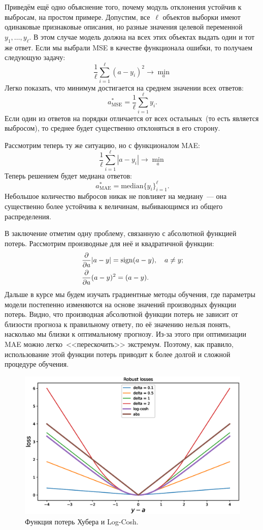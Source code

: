 \documentclass[12pt,fleqn]{article}
\begin{document}
Приведём ещё одно объяснение того, почему модуль отклонения устойчив к выбросам,
на простом примере.
Допустим, все~$\ell$ объектов выборки имеют одинаковые признаковые описания, но разные
значения целевой переменной~$y_1, \dots, y_\ell$.
В этом случае модель должна на всех этих объектах выдать один и тот же ответ.
Если мы выбрали MSE в качестве функционала ошибки, то получаем следующую задачу:
\[
    \frac{1}{\ell}
    \sum_{i = 1}^{\ell} \left(
        a - y_i
    \right)^2
    \to
    \min_a
\]
Легко показать, что минимум достигается на среднем значении всех ответов:
\[
    a_{\text{MSE}}^*
    =
    \frac{1}{\ell}
    \sum_{i = 1}^{\ell}
        y_i.
\]
Если один из ответов на порядки отличается от всех остальных~(то есть является выбросом),
то среднее будет существенно отклоняться в его сторону.

Рассмотрим теперь ту же ситуацию, но с функционалом MAE:
\[
    \frac{1}{\ell}
    \sum_{i = 1}^{\ell} \left|
        a - y_i
    \right|
    \to
    \min_a
\]
Теперь решением будет медиана ответов:
\[
    a_{\text{MAE}}^*
    =
    \text{median}
        \{y_i\}_{i = 1}^{\ell}.
\]
Небольшое количество выбросов никак не повлияет на медиану~--- она существенно
более устойчива к величинам, выбивающимся из общего распределения.

В заключение отметим одну проблему, связанную с абсолютной функцией потерь.
Рассмотрим производные для неё и квадратичной функции:
\begin{align*}
    &\frac{\partial}{\partial a} |a - y| = \mathop{\rm sign}\limits (a - y), \quad a \neq y; \\
    &\frac{\partial}{\partial a} (a - y)^2 = (a - y).
\end{align*}
Дальше в курсе мы будем изучать градиентные методы обучения,
где параметры модели постепенно изменяются на основе значений производных функции потерь.
Видно, что производная абсолютной функции потерь не зависит от близости прогноза к правильному ответу,
по её значению нельзя понять, насколько мы близки к оптимальному прогнозу.
Из-за этого при оптимизации MAE можно легко~<<перескочить>> экстремум.
Поэтому, как правило, использование этой функции потерь приводит к более долгой и сложной
процедуре обучения.

\begin{figure}[t]
    \centering
    \includegraphics[width=1.0\textwidth]{pics/robust_losses.eps}
    \caption{Функция потерь Хубера и Log-Cosh.}
    \label{fig:robust_losses}
\end{figure}
\end{document}
